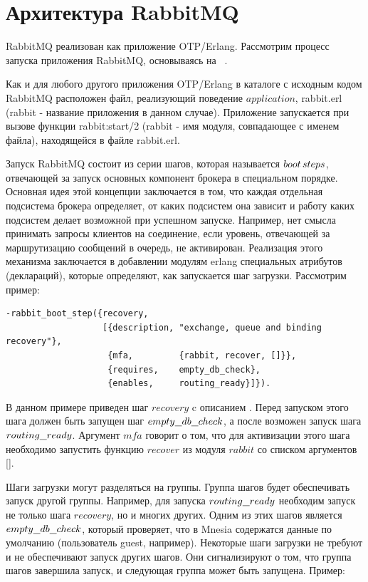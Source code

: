 \section{Архитектура RabbitMQ}
RabbitMQ реализован как приложение OTP/Erlang. Рассмотрим процесс запуска приложения RabbitMQ, основываясь на ~\autocite{5}.\par Как и для любого другого приложения OTP/Erlang в каталоге с исходным кодом RabbitMQ расположен файл, реализующий поведение $application$, rabbit.erl (rabbit - название приложения в данном случае). Приложение запускается при вызове функции rabbit:start/2 (rabbit - имя модуля, совпадающее с именем файла), находящейся в файле rabbit.erl.\par
Запуск RabbitMQ состоит из серии шагов, которая называется $boot\thinspace steps$, отвечающей за запуск основных компонент брокера в специальном порядке. Основная идея этой концепции заключается в том, что каждая отдельная подсистема брокера определяет, от каких подсистем она зависит и работу каких подсистем делает возможной при успешном запуске. Например, нет смысла принимать запросы клиентов на соединение, если уровень, отвечающей за маршрутизацию сообщений в очередь, не активирован. Реализация этого механизма заключается в добавлении модулям erlang специальных атрибутов (деклараций),  которые определяют, как запускается шаг загрузки. Рассмотрим пример:
\begin{lstlisting}
-rabbit_boot_step({recovery,
                   [{description, "exchange, queue and binding recovery"},
                    {mfa,         {rabbit, recover, []}},
                    {requires,    empty_db_check},
                    {enables,     routing_ready}]}).
\end{lstlisting}
В данном примере приведен шаг $recovery$ c описанием . 
Перед запуском этого шага должен быть запущен шаг $empty\underline{\hspace{0.25cm}}db\underline{\hspace{0.25cm}}check$, а после возможен запуск шага $routing\underline{\hspace{0.25cm}}ready$. Аргумент $mfa$ говорит о том, что для активизации этого шага необходимо запустить функцию $recover$ из модуля $rabbit$ со списком аргументов [].\par
Шаги загрузки могут разделяться на группы. Группа шагов будет обеспечивать запуск другой группы. Например, для запуска $routing\underline{\hspace{0.25cm}}ready$ необходим запуск не только шага $recovery$, но и многих других. Одним из этих шагов является $empty\underline{\hspace{0.25cm}}db\underline{\hspace{0.25cm}}check$, который проверяет, что в Mnesia содержатся данные по умолчанию (пользователь guest, например). Некоторые шаги загрузки не требуют и не обеспечивают запуск других шагов. Они сигнализируют о том, что группа шагов завершила запуск, и следующая группа может быть запущена. Пример:
